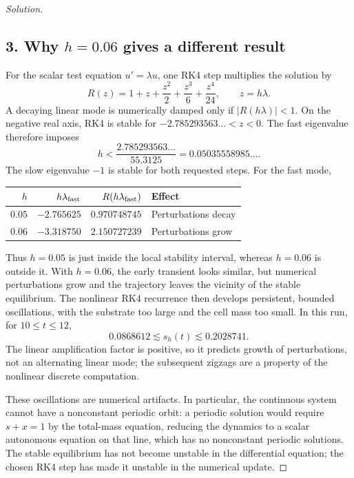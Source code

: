 \documentclass[12pt]{amsart}
\newenvironment{solution}
{\begin{proof}[Solution]}
{\end{proof}}
\begin{document}
\begin{onehalfspace}
\begin{solution}
            \subsection*{3. Why $h=0.06$ gives a different result}
            For the scalar test equation $u'=\lambda u$, one RK4 step multiplies
            the solution by
            \[
                R(z)=1+z+\frac{z^2}{2}+\frac{z^3}{6}+\frac{z^4}{24},\qquad z=h\lambda.
            \]
            A decaying linear mode is numerically damped only if $|R(h\lambda)|<1$.
            On the negative real axis, RK4 is stable for
            $-2.785293563\ldots<z<0$. The fast eigenvalue therefore imposes
            \[
                \boxed{h<\frac{2.785293563\ldots}{55.3125}
                    =0.05035558985\ldots.}
            \]
            The slow eigenvalue $-1$ is stable for both requested steps. For the fast mode,
            \begin{center}
                \begin{tabular}{rrrl}\toprule
                    $h$ & $h\lambda_{\rm fast}$ & $R(h\lambda_{\rm fast})$ & Effect\\\midrule
                    $0.05$ & $-2.765625$ & $0.970748745$ & Perturbations decay\\
                    $0.06$ & $-3.318750$ & $2.150727239$ & Perturbations grow\\\bottomrule
                \end{tabular}
            \end{center}
            Thus $h=0.05$ is just inside the local stability interval, whereas
            $h=0.06$ is outside it. With $h=0.06$, the early transient looks similar,
            but numerical perturbations grow and the trajectory leaves the vicinity
            of the stable equilibrium. The nonlinear RK4 recurrence then develops
            persistent, bounded oscillations, with the substrate too large and the
            cell mass too small. In this run, for $10\le t\le12$,
            \[
                0.0868612\lesssim s_h(t)\lesssim0.2028741.
            \]
            The linear amplification factor is positive, so it predicts growth of
            perturbations, not an alternating linear mode; the subsequent zigzags
            are a property of the nonlinear discrete computation.

            These oscillations are numerical artifacts. In particular, the continuous
            system cannot have a nonconstant periodic orbit: a periodic solution
            would require $s+x=1$ by the total-mass equation, reducing the dynamics
            to a scalar autonomous equation on that line, which has no nonconstant
            periodic solutions. The stable equilibrium has not become unstable in
            the differential equation; the chosen RK4 step has made it unstable
            in the numerical update.


\end{solution}
\end{onehalfspace}
\end{document}
